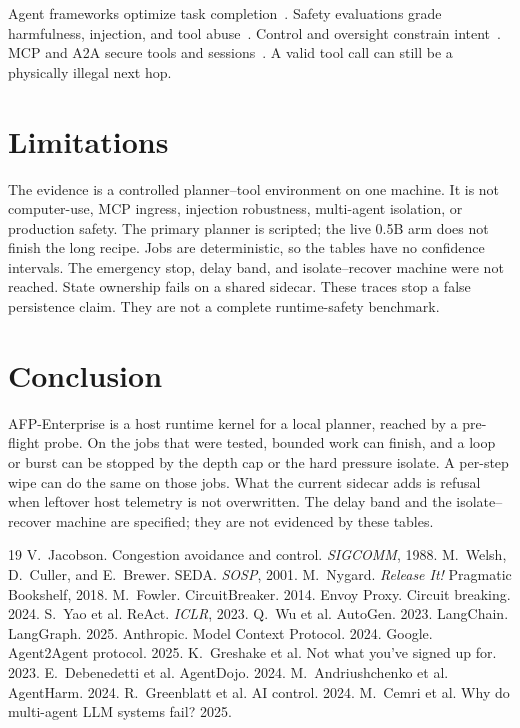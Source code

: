 \documentclass[11pt,a4paper]{article}
\begin{document}
Agent frameworks optimize task completion~\cite{yao2023,wu2023,langchain2025}.
Safety evaluations grade harmfulness, injection, and tool abuse~\cite{greshake2023,debenedetti2024,andriushchenko2024}.
Control and oversight constrain intent~\cite{greenblatt2024}.
MCP and A2A secure tools and sessions~\cite{anthropic2024,google2025}.
A valid tool call can still be a physically illegal next hop.

\section{Limitations}

The evidence is a controlled planner--tool environment on one machine.
It is not computer-use, MCP ingress, injection robustness, multi-agent isolation, or production safety.
The primary planner is scripted; the live 0.5B arm does not finish the long recipe.
Jobs are deterministic, so the tables have no confidence intervals.
The emergency stop, delay band, and isolate--recover machine were not reached.
State ownership fails on a shared sidecar.
These traces stop a false persistence claim.
They are not a complete runtime-safety benchmark.

\section{Conclusion}

AFP-Enterprise is a host runtime kernel for a local planner, reached by a pre-flight probe.
On the jobs that were tested, bounded work can finish, and a loop or burst can be stopped by the depth cap or the hard pressure isolate.
A per-step wipe can do the same on those jobs.
What the current sidecar adds is refusal when leftover host telemetry is not overwritten.
The delay band and the isolate--recover machine are specified; they are not evidenced by these tables.

\begin{thebibliography}{19}
 V.~Jacobson. Congestion avoidance and control. \emph{SIGCOMM}, 1988.
 M.~Welsh, D.~Culler, and E.~Brewer. SEDA. \emph{SOSP}, 2001.
 M.~Nygard. \emph{Release It!} Pragmatic Bookshelf, 2018.
 M.~Fowler. CircuitBreaker. 2014.
 Envoy Proxy. Circuit breaking. 2024.
 S.~Yao et al. ReAct. \emph{ICLR}, 2023.
 Q.~Wu et al. AutoGen. 2023.
 LangChain. LangGraph. 2025.
 Anthropic. Model Context Protocol. 2024.
 Google. Agent2Agent protocol. 2025.
 K.~Greshake et al. Not what you've signed up for. 2023.
 E.~Debenedetti et al. AgentDojo. 2024.
 M.~Andriushchenko et al. AgentHarm. 2024.
 R.~Greenblatt et al. AI control. 2024.
 M.~Cemri et al. Why do multi-agent LLM systems fail? 2025.
\end{thebibliography}
\end{document}
